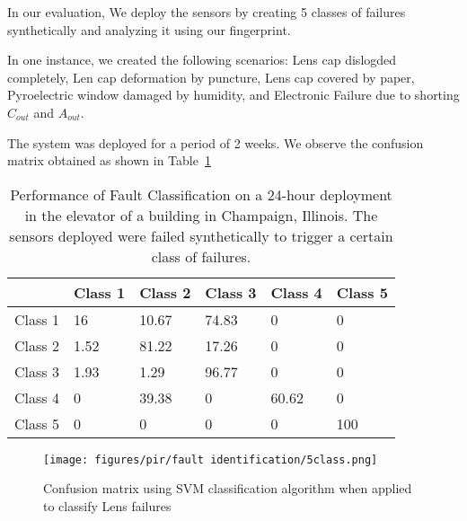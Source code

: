 In our evaluation, We deploy the sensors by creating 5 classes of failures synthetically and analyzing it using our fingerprint. 

In one instance, we created the following scenarios: \ca Lens cap dislogded completely, \cb Len cap deformation by puncture, \cc Lens cap covered by paper, \cd Pyroelectric window damaged by humidity, and \ce Electronic Failure due to shorting $C_{out}$ and $A_{out}$.

The system was deployed for a period of 2 weeks. We observe the confusion matrix obtained as shown in Table~\ref{tbl:fault_classification_perf}

\begin{table}[h]\small
        \centering
        \caption{Performance of Fault Classification on a 24-hour deployment in the elevator of a building in Champaign, Illinois. The sensors deployed were failed synthetically to trigger a certain class of failures.}
        \begin{tabular}{p{0.9cm}p{0.9cm}p{0.9cm}p{0.9cm}p{0.9cm}p{0.9cm}}
            \hline
            \textbf{} & \textbf{Class 1} & \textbf{Class 2} & \textbf{Class 3} & \textbf{Class 4}& \textbf{Class 5} \\
            \hline \hline
            \rowcolor{gray!20} Class 1 & 16 & 10.67 & 74.83 & 0 & 0 \\
            Class 2 & 1.52 & 81.22 & 17.26 & 0 & 0 \\
            \rowcolor{gray!20} Class 3 & 1.93 & 1.29 & 96.77 & 0 & 0  \\
            Class 4 & 0 & 39.38 & 0 & 60.62 & 0\\
            \rowcolor{gray!20} Class 5 & 0 & 0 & 0 & 0 & 100\\
            \hline 
        \end{tabular}
        \label{tbl:fault_classification_perf}
\end{table}


\begin{figure}[!t]
\centering
\texttt{[image: figures/pir/fault identification/5class.png]}
\caption{Confusion matrix using SVM classification algorithm when applied to classify Lens failures}
\label{tbl:fault_classification_perf_2}
\end{figure}

